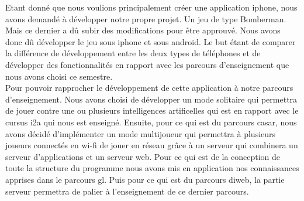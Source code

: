 
 Etant donné que nous voulions principalement créer une application
 \gls{iphone}, nous avons demandé à développer notre propre projet. Un jeu de
 type Bomberman. Mais ce dernier a dû subir des modifications pour être
 approuvé. Nous avons donc dû développer le jeu sous \gls{iphone} et sous
 \gls{android}. Le but étant de comparer la différence de développement entre
 les deux types de téléphones et de développer des fonctionnalités en rapport
 avec les parcours d'enseignement que nous avons choisi ce semestre.\\
	
	
Pour pouvoir rapprocher le développement de cette application à notre parcours
d'enseignement. Nous avons choisi de développer un mode solitaire qui permettra
de jouer contre une ou plusieurs intelligences artificelles qui est en rapport
avec le cursus \gls{i2a} qui nous est enseigné. Ensuite, pour ce qui est du
parcours \gls{casar}, nous avons décidé d'implémenter un mode multijoueur qui
permettra à plusieurs joueurs connectés en \gls{wi-fi} de jouer en réseau grâce
à un serveur qui combinera un serveur d'applications et un serveur web. Pour ce qui est de la conception de toute la structure du programme nous avons mis en application nos connaissances apprises dans le parcours \gls{gl}. Puis pour ce qui est du parcours \gls{diweb}, la partie serveur permettra de palier à
l'enseignement de ce dernier parcours. 
	
